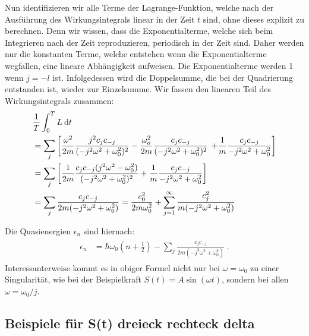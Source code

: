    Nun identifizieren wir alle Terme der Lagrange-Funktion, welche nach der Ausführung des Wirkungsintegrals linear in der Zeit $t$ sind, ohne dieses explizit zu berechnen.
   Denn wir wissen, dass die Exponentialterme, welche sich beim Integrieren nach der Zeit reproduzieren, periodisch in der Zeit sind.
   Daher werden nur die konstanten Terme, welche entstehen wenn die Exponentialterme wegfallen, eine lineare Abhängigkeit aufweisen.
   Die Exponentialterme werden 1 wenn $j=-l$ ist.
   Infolgedessen wird die Doppelsumme, die bei der Quadrierung entstanden ist, wieder zur Einzelsumme.
   Wir fassen den linearen Teil des Wirkungsintegrals zusammen:
   \begin{align}
     \begin{split}
       &\frac{1}{T} \int_0^T L \: \text d t \\
       &= \sum_j \left[\frac{\omega^2}{2m} \frac{j^2c_jc_{-j}}{(-j^2\omega^2+\omega_0^2)^2}
       - \frac{\omega_o^2}{2m} \frac{c_jc_{-j}}{(-j^2\omega^2+\omega_0^2)^2} \right.
       \left. +\frac{1}{m} \frac{c_jc_{-j}}{-j^2\omega^2+\omega_0^2}
       \right]\\
       &= \sum_j \left[\frac{1}{2m} \frac{c_jc_{-j}(j^2\omega^2-\omega_0^2)}{(-j^2\omega^2+\omega_0^2)^2} + \frac{1}{m} \frac{c_jc_{-j}}{-j^2\omega^2+\omega_0^2} \right] \\
       &= \sum_j \frac{c_jc_{-j}}{2m(-j^2\omega^2+\omega_0^2)} = \frac{c_0^2}{2m\omega_0^2} + \sum_{j=1}^\infty \frac{c_j^2}{m(-j^2\omega^2+\omega_0^2)}
     \end{split}
   \end{align}

   Die Quasienergien $\epsilon_n$ sind hiernach:
   \begin{align}
     \begin{split}
       \epsilon_n &= \hbar \omega_0\left(n+\frac{1}{2}\right) - \sum_j \frac{c_jc_{-j}}{2m(-j^2\omega^2+\omega_0^2)} \; .
     \end{split}
   \end{align}
   Interessanterweise kommt es in obiger Formel nicht nur bei $\omega = \omega_0$ zu einer Singularität, wie bei der Beispielkraft $S(t) = A\sin(\omega t)$, sondern bei allen $\omega = \omega_0 / j$.



   \subsection{Beispiele für S(t) dreieck rechteck delta}





